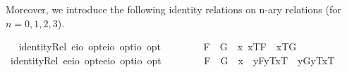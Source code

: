 \begin{isabellebody}
\begin{isamarkuptext}%
Moreover, we introduce the following identity relations on n-ary relations (for $n=0,1,2,3$).%
\end{isamarkuptext}\isamarkuptrue%
\ \isamarkupfalse%
\ identityRel{}{\isacharcolon}{\isacharcolon}{\isachardoublequoteopen}\ {\isacharparenleft}{\isacharparenleft}e{\isasymRightarrow}io{\isacharparenright}\ opt{\isacharparenright}{\isasymRightarrow}{\isacharparenleft}{\isacharparenleft}e{\isasymRightarrow}io{\isacharparenright}\ opt{\isacharparenright}{\isasymRightarrow}io\ opt{\isachardoublequoteclose}\ {\isacharparenleft}\ {\isachardoublequoteopen}\isactrlbold {\isacharequal}\ {}{}{\isacharparenright}\ \isanewline
\ \ \ \ {\isachardoublequoteopen}F{}\ \isactrlbold {\isacharequal}\ G{}\ {\isasymequiv}\ \isactrlbold {\isasymbox}{\isacharparenleft}\isactrlbold {\isasymforall}x{\isachardot}\ {\isasymlbrace}x\isactrlsup T{\isacharcomma}F{}{\isasymrbrace}\ \isactrlbold {\isasymequiv}\ {\isasymlbrace}x\isactrlsup T{\isacharcomma}G{}{\isasymrbrace}{\isacharparenright}{\isachardoublequoteclose}\isanewline
\isanewline
\ \isamarkupfalse%
\ identityRel{}{\isacharcolon}{\isacharcolon}{\isachardoublequoteopen}\ {\isacharparenleft}{\isacharparenleft}e{\isasymRightarrow}e{\isasymRightarrow}io{\isacharparenright}\ opt{\isacharparenright}{\isasymRightarrow}{\isacharparenleft}{\isacharparenleft}e{\isasymRightarrow}e{\isasymRightarrow}io{\isacharparenright}\ opt{\isacharparenright}{\isasymRightarrow}io\ opt{\isachardoublequoteclose}\ {\isacharparenleft}\ {\isachardoublequoteopen}\isactrlbold {\isacharequal}\ {}{}{\isacharparenright}\ \isanewline
\ \ \ \ {\isachardoublequoteopen}F{}\ \isactrlbold {\isacharequal}\ G{}\ {\isasymequiv}\ \isactrlbold {\isasymforall}x{}{\isachardot}{\isacharparenleft}\ \ {\isacharparenleft}\isactrlbold {\isasymlambda}y{\isachardot}{\isasymlparr}F{}{\isacharcomma}y\isactrlsup T{\isacharcomma}x{}\isactrlsup T{\isasymrparr}{\isacharparenright}\ \isactrlbold {\isacharequal}\ {\isacharparenleft}\isactrlbold {\isasymlambda}y{\isachardot}{\isasymlparr}G{}{\isacharcomma}y\isactrlsup T{\isacharcomma}x{}\isactrlsup T{\isasymrparr}{\isacharparenright}\isanewline

\end{isabellebody}
